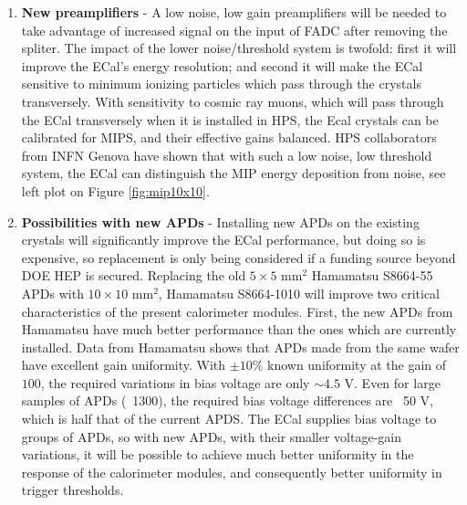 \begin{enumerate}
\item {\bf New preamplifiers} - A low noise, low gain preamplifiers will be needed to take advantage of increased signal on the input of FADC after removing the spliter. The impact of the lower noise/threshold system is twofold: first it 
will improve the ECal's energy resolution; and second it will make the ECal sensitive to minimum ionizing particles which pass through the crystals transversely. With sensitivity to cosmic ray muons, which will pass through the ECal transversely when it is installed in HPS, the Ecal crystals can be calibrated for MIPS, and their effective gains balanced.  HPS collaborators from INFN Genova have shown that with such a low noise, low threshold system, the ECal can distinguish the MIP energy deposition from noise, see left plot on Figure \ref{fig:mip10x10}.



\item{\bf Possibilities with new APDs} - Installing new APDs on the existing crystals will significantly improve the ECal performance, but doing so is expensive,  so replacement is only being considered if a funding source beyond DOE HEP is secured. Replacing the old $5\times 5$ mm$^2$ 
Hamamatsu S8664-55 APDs with $10\times 10$ mm$^2$, Hamamatsu S8664-1010 will improve two critical characteristics of the present calorimeter modules. First, the new APDs from Hamamatsu have much better performance than the ones which are currently installed. Data from Hamamatsu shows that APDs made from the same wafer have excellent gain uniformity. With $\pm 10\%$ known uniformity 
at the gain of $100$, the required variations in bias voltage are only $\sim 4.5$ V. Even for large samples of APDs (~1300),  the required bias voltage differences are ~50 V, which is half that of the current APDS. The ECal supplies bias voltage to groups of APDs, so with new APDs, with their smaller voltage-gain variations, it will be possible to achieve much better 
uniformity in the response of the calorimeter modules, and consequently better uniformity in trigger thresholds. 


\end{enumerate}
